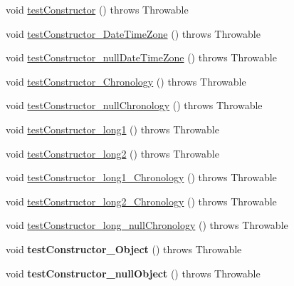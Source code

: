 \begin{DoxyCompactItemize}
\item 
void \hyperlink{classorg_1_1joda_1_1time_1_1_test_year_month___constructors_a21a55f89ee5f98e5bbab81e37caf6217}{test\-Constructor} ()  throws Throwable 
\item 
void \hyperlink{classorg_1_1joda_1_1time_1_1_test_year_month___constructors_a15eec462adef46fd0ff91cf0c3dd9ddd}{test\-Constructor\-\_\-\-Date\-Time\-Zone} ()  throws Throwable 
\item 
void \hyperlink{classorg_1_1joda_1_1time_1_1_test_year_month___constructors_a1cc52bb8d1d9dd75df61a4e52963c23e}{test\-Constructor\-\_\-null\-Date\-Time\-Zone} ()  throws Throwable 
\item 
void \hyperlink{classorg_1_1joda_1_1time_1_1_test_year_month___constructors_a51031711590e0d2892bc93e037daf162}{test\-Constructor\-\_\-\-Chronology} ()  throws Throwable 
\item 
void \hyperlink{classorg_1_1joda_1_1time_1_1_test_year_month___constructors_aee7436eabb791d1a47c7565a914dd670}{test\-Constructor\-\_\-null\-Chronology} ()  throws Throwable 
\item 
void \hyperlink{classorg_1_1joda_1_1time_1_1_test_year_month___constructors_a09c8302bf5516d61814516c5bf208ca5}{test\-Constructor\-\_\-long1} ()  throws Throwable 
\item 
void \hyperlink{classorg_1_1joda_1_1time_1_1_test_year_month___constructors_a668ba2227f4fdc753931ca09ff63233a}{test\-Constructor\-\_\-long2} ()  throws Throwable 
\item 
void \hyperlink{classorg_1_1joda_1_1time_1_1_test_year_month___constructors_ac3b81e8c4fc9aace0c13e5e2020c4ad7}{test\-Constructor\-\_\-long1\-\_\-\-Chronology} ()  throws Throwable 
\item 
void \hyperlink{classorg_1_1joda_1_1time_1_1_test_year_month___constructors_a2f0c9dc42d7cae7dbfc772bfb284f4a2}{test\-Constructor\-\_\-long2\-\_\-\-Chronology} ()  throws Throwable 
\item 
void \hyperlink{classorg_1_1joda_1_1time_1_1_test_year_month___constructors_a5ae8652f63d4c587131e5b30866503da}{test\-Constructor\-\_\-long\-\_\-null\-Chronology} ()  throws Throwable 
\item 
\hypertarget{classorg_1_1joda_1_1time_1_1_test_year_month___constructors_ace0b574b5002f3d2c02501f0dc37cfb3}{void {\bfseries test\-Constructor\-\_\-\-Object} ()  throws Throwable }\label{classorg_1_1joda_1_1time_1_1_test_year_month___constructors_ace0b574b5002f3d2c02501f0dc37cfb3}

\item 
\hypertarget{classorg_1_1joda_1_1time_1_1_test_year_month___constructors_a5da61e39a28e3fd846d1f3e0dd079e61}{void {\bfseries test\-Constructor\-\_\-null\-Object} ()  throws Throwable }\label{classorg_1_1joda_1_1time_1_1_test_year_month___constructors_a5da61e39a28e3fd846d1f3e0dd079e61}


\end{DoxyCompactItemize}
